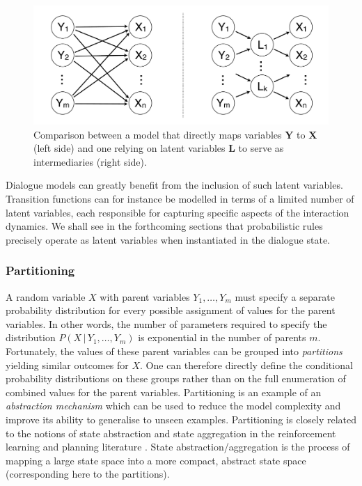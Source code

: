  \begin{figure}[ht]
\centering
\includegraphics[scale=0.25]{imgs/latentvariables.pdf}
\caption{Comparison between a model that directly maps variables $\mathbf{Y}$ to $\mathbf{X}$ (left side) and one relying on latent variables $\mathbf{L}$ to serve as intermediaries (right side).}
\label{fig:latentvariables}
\end{figure}

Dialogue models can greatly benefit from the inclusion of such latent variables. Transition functions can for instance be modelled in terms of a limited number of latent variables, each responsible for capturing specific aspects of the interaction dynamics.  We shall see in the forthcoming sections that probabilistic rules precisely operate as latent variables when instantiated in the dialogue state. 

\subsubsection*{Partitioning}
A random variable $X$ with parent variables $Y_1,\dots, Y_m$ must specify a separate probability distribution for every possible assignment of values for the parent variables. In other words, the number of parameters required to specify the distribution $P(X \, | \, Y_1, \dots, Y_m)$ is exponential in the number of parents $m$. Fortunately, the values of these parent variables can be grouped into \textit{partitions} yielding similar outcomes for $X$. One can therefore directly define the conditional probability distributions on these groups rather than on the full enumeration of combined values for the parent variables. Partitioning is an example of an \textit{abstraction mechanism} which can be used to reduce the model complexity and improve its ability to generalise to unseen examples. Partitioning is closely related to the notions of state abstraction and state aggregation in the reinforcement learning and planning literature \citep{conf/isaim/LiWL06}.  State abstraction/aggregation is the process of mapping a large state space into a more compact, abstract state space (corresponding here to the partitions).

